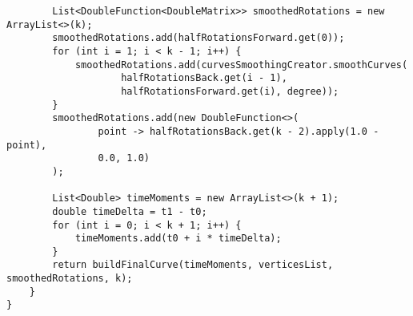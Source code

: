 \begin{verbatim}
        List<DoubleFunction<DoubleMatrix>> smoothedRotations = new ArrayList<>(k);
        smoothedRotations.add(halfRotationsForward.get(0));
        for (int i = 1; i < k - 1; i++) {
            smoothedRotations.add(curvesSmoothingCreator.smoothCurves(
                    halfRotationsBack.get(i - 1),
                    halfRotationsForward.get(i), degree));
        }
        smoothedRotations.add(new DoubleFunction<>(
                point -> halfRotationsBack.get(k - 2).apply(1.0 - point),
                0.0, 1.0)
        );

        List<Double> timeMoments = new ArrayList<>(k + 1);
        double timeDelta = t1 - t0;
        for (int i = 0; i < k + 1; i++) {
            timeMoments.add(t0 + i * timeDelta);
        }
        return buildFinalCurve(timeMoments, verticesList, smoothedRotations, k);
    }
}
\end{verbatim}

